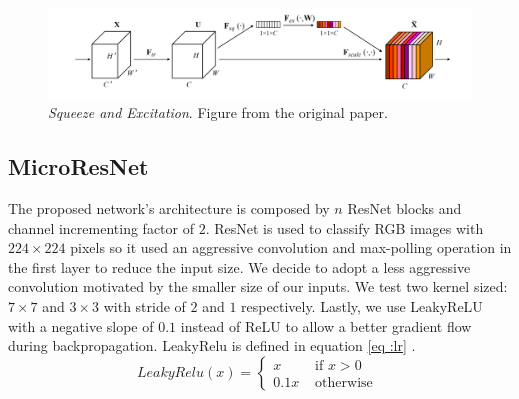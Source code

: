 \documentclass[../document.tex]{subfiles}
\begin{document}
\begin{figure}[htbp]
    \centering
    \includegraphics[width=\linewidth]{../img/implementation/estimator/se.png}
    \caption{\emph{Squeeze and Excitation}. Figure from the original paper. \cite{hu2017squeeze}}
\label{fig : se}
\end{figure}
\subsection{MicroResNet}
\label{subsec : micro-resnets}
The proposed network's architecture is composed by $n$ ResNet blocks and channel incrementing factor of $2$. ResNet is used to classify RGB images with $224\times224$ pixels so it used an aggressive convolution and max-polling operation in the first layer to reduce the input size. We decide to adopt a less aggressive convolution motivated by the smaller size of our inputs. We test two kernel sized: $7\times7$ and $3\times3$ with stride of $2$ and $1$ respectively. Lastly, we use LeakyReLU \cite{leakyrelu} with a negative slope of $0.1$ instead of ReLU to allow a better gradient flow during backpropagation. LeakyRelu is defined in equation \ref{eq :lr} .
\begin{equation}
LeakyRelu(x)=\left\{\begin{array}{ll}{x} & {\text { if } x>0} \\ {0.1 x} & {\text { otherwise }}\end{array}\right.
\label{eq : lr}
\end{equation}
\end{document}
